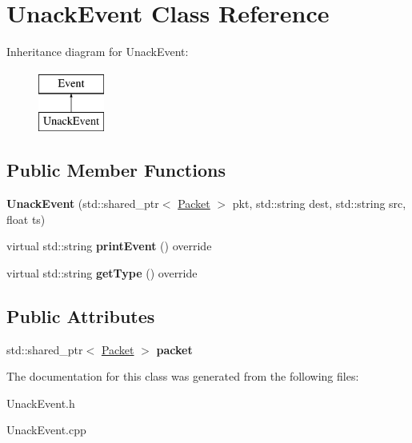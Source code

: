 \hypertarget{classUnackEvent}{\section{\-Unack\-Event \-Class \-Reference}
\label{classUnackEvent}
}
\-Inheritance diagram for \-Unack\-Event\-:\begin{figure}[H]
\begin{center}
\leavevmode
\includegraphics[height=2.000000cm]{classUnackEvent}
\end{center}
\end{figure}
\subsection*{\-Public \-Member \-Functions}
\begin{DoxyCompactItemize}
\item 
\hypertarget{classUnackEvent_abd9be091010bf06561b3b775e914b094}{{\bfseries \-Unack\-Event} (std\-::shared\-\_\-ptr$<$ \hyperlink{classPacket}{\-Packet} $>$ pkt, std\-::string dest, std\-::string src, float ts)}\label{classUnackEvent_abd9be091010bf06561b3b775e914b094}

\item 
\hypertarget{classUnackEvent_a7bc2907c2c7454c761acd654e9b64ca8}{virtual std\-::string {\bfseries print\-Event} () override}\label{classUnackEvent_a7bc2907c2c7454c761acd654e9b64ca8}

\item 
\hypertarget{classUnackEvent_a56ca06731117d1fff95a1601abed02e8}{virtual std\-::string {\bfseries get\-Type} () override}\label{classUnackEvent_a56ca06731117d1fff95a1601abed02e8}

\end{DoxyCompactItemize}
\subsection*{\-Public \-Attributes}
\begin{DoxyCompactItemize}
\item 
\hypertarget{classUnackEvent_ad9d09191d5ee31c15c554e797a708f7d}{std\-::shared\-\_\-ptr$<$ \hyperlink{classPacket}{\-Packet} $>$ {\bfseries packet}}\label{classUnackEvent_ad9d09191d5ee31c15c554e797a708f7d}

\end{DoxyCompactItemize}


\-The documentation for this class was generated from the following files\-:\begin{DoxyCompactItemize}
\item 
\-Unack\-Event.\-h\item 
\-Unack\-Event.\-cpp\end{DoxyCompactItemize}
